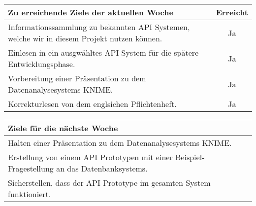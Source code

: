 \begin{tabularx}{\textwidth}{Xc}
    \arrayrulecolor{OliveGreen}
    \toprule
    {\bfseries Zu erreichende Ziele der aktuellen Woche} & {\bfseries Erreicht} \\
    \midrule[2pt]
    Informationssammlung zu bekannten API Systemen, welche wir in diesem Projekt nutzen können.                  &Ja                    \\
    \rowcolor{OliveGreen!15}
    Einlesen in ein ausgwähltes API System für die spätere Entwicklungsphase. &Ja                    \\
    \rowcolor{White}
    Vorbereitung einer Präsentation zu dem Datenanalysesystems KNIME. &Ja \\
    \rowcolor{OliveGreen!15}
    Korrekturlesen von dem englsichen Pflichtenheft. &Ja \\
    \bottomrule[2pt]
\end{tabularx}
%
\vspace{1cm}
%
\begin{tabularx}{\textwidth}{Xc}
    \arrayrulecolor{OliveGreen}
    \toprule
    {\bfseries Ziele für die nächste Woche}              &                      \\
    \midrule[2pt]
    Halten einer Präsentation zu dem Datenanalysesystems KNIME.                               &                      \\
    \rowcolor{OliveGreen!15}
    Erstellung von einem API Prototypen mit einer Beispiel-Fragestellung an das Datenbanksystems.                              &                      \\
    \rowcolor{White}
    Sicherstellen, dass der API Prototype im gesamten System funktioniert.  & \\
\end{tabularx}
